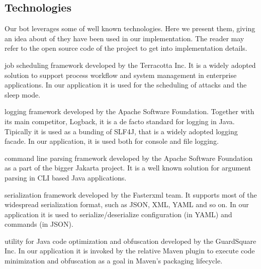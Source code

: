 \subsection{Technologies}
\label{sec:technologies}

Our bot leverages some of well known technologies. Here we present them, giving an idea about of they have been used in our implementation. The reader may refer to the open source code of the project to get into implementation details.

\begin{description}
  \setlength\itemsep{1em}
  \item[QUARTZ] job scheduling framework developed by the Terracotta Inc.
  It is a widely adopted solution to support process workflow and system management in enterprise applications.
  In our application it is used for the scheduling of attacks and the sleep mode.

  \item[LOG4J2] logging framework developed by the Apache Software Foundation.
  Together with its main competitor, Logback, it is a de facto standard for logging in Java. Tipically it is used as a bunding of SLF4J, that is a widely adopted logging facade.
  In our application, it is used both for console and file logging.

  \item[COMMONS CLI] command line parsing framework developed by the Apache Software Foundation as a part of the bigger Jakarta project.
  It is a well known solution for argument parsing in CLI based Java applications.

  \item[JACKSON] serialization framework developed by the Fasterxml team.
  It supports most of the widespread serialization format, such as JSON, XML, YAML and so on.
  In our application it is used to serialize/deserialize configuration (in YAML) and commands (in JSON).

  \item[PROGUARD] utility for Java code optimization and obfuscation developed by the GuardSquare Inc.
  In our application it is invoked by the relative Maven plugin to execute code minimization and obfuscation as a goal in Maven's packaging lifecycle.

\end{description}
